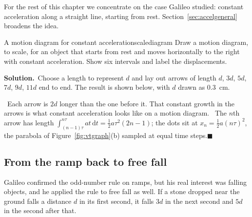 \documentclass[11pt,twoside,openany]{book}
\newcommand{\dd}{\mathrm{d}}
\newcommand{\viewtag}[3]{\fcolorbox{#2}{#3}{\footnotesize\textbf{\textcolor{#2}{#1}}}}
\newcommand{\elemtag}{\viewtag{Elementary}{elemcol}{elempale}}
\newcommand{\calctag}{\viewtag{Calculus}{calccol}{calcpale}}
\newcommand{\solution}{\par\smallskip\noindent\textbf{Solution.}\ }
\newcommand{\qed}{\hfill$\blacksquare$}
\begin{document}
For the rest of this chapter we concentrate on the case Galileo studied: constant acceleration along a straight line, starting from rest. Section~\ref{sec:accelgeneral} broadens the idea.

\begin{example}{A motion diagram for constant acceleration}{scalediagram}
Draw a motion diagram, to scale, for an object that starts from rest and moves horizontally to the right with constant acceleration. Show six intervals and label the displacements.

\solution Choose a length to represent $d$ and lay out arrows of length $d$, $3d$, $5d$, $7d$, $9d$, $11d$ end to end. The result is shown below, with $d$ drawn as \SI{0.3}{\centi\metre}.
\begin{center}
\end{center}
\elemtag\ Each arrow is $2d$ longer than the one before it. That constant growth in the arrows is what constant acceleration looks like on a motion diagram. \calctag\ The $n$th arrow has length $\int_{(n-1)\tau}^{n\tau} at\,\dd t = \tfrac12 a\tau^2(2n-1)$; the dots sit at $x_n = \tfrac12 a(n\tau)^2$, the parabola of Figure~\ref{fig:vtgraph}(b) sampled at equal time steps.\qed
\end{example}

\subsection{From the ramp back to free fall}

Galileo confirmed the odd-number rule on ramps, but his real interest was falling objects, and he applied the rule to free fall as well. If a stone dropped near the ground falls a distance $d$ in its first second, it falls $3d$ in the next second and $5d$ in the second after that.
\end{document}
